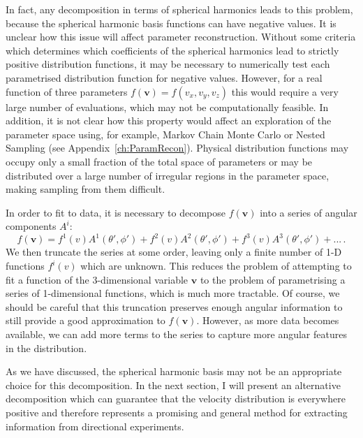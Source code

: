 In fact, any decomposition in terms of spherical harmonics leads to this problem, because the spherical harmonic basis functions can have negative values. It is unclear how this issue will affect parameter reconstruction. Without some criteria which determines which coefficients of the spherical harmonics lead to strictly positive distribution functions, it may be necessary to numerically test each parametrised distribution function for negative values. However, for a real function of three parameters $f(\textbf{v}) = f(v_x, v_y, v_z)$ this would require a very large number of evaluations, which may not be computationally feasible. In addition, it is not clear how this property would affect an exploration of the parameter space using, for example, Markov Chain Monte Carlo or Nested Sampling (see Appendix~\ref{ch:ParamRecon}). Physical distribution functions may occupy only a small fraction of the total space of parameters or may be distributed over a large number of irregular regions in the parameter space, making sampling from them difficult.

In order to fit to data, it is necessary to decompose $f(\textbf{v})$ into a series of angular components $A^i$:
\begin{equation}
f(\textbf{v}) = f^1(v) A^1(\theta',\phi') + f^2(v) A^2(\theta',\phi') +f^3(v) A^3(\theta',\phi') +...\,.
\end{equation}
We then truncate the series at some order, leaving only a finite number of 1-D functions $f^i(v)$ which are unknown. This reduces the problem of attempting to fit a function of the 3-dimensional variable $\textbf{v}$ to the problem of parametrising a series of 1-dimensional functions, which is much more tractable. Of course, we should be careful that this truncation preserves enough angular information to still provide a good approximation to $f(\textbf{v})$. However, as more data becomes available, we can add more terms to the series to capture more angular features in the distribution.

As we have discussed, the spherical harmonic basis may not be an appropriate choice for this decomposition. In the next section, I will present an alternative decomposition which can guarantee that the velocity distribution is everywhere positive and therefore represents a promising and general method for extracting information from directional experiments.


